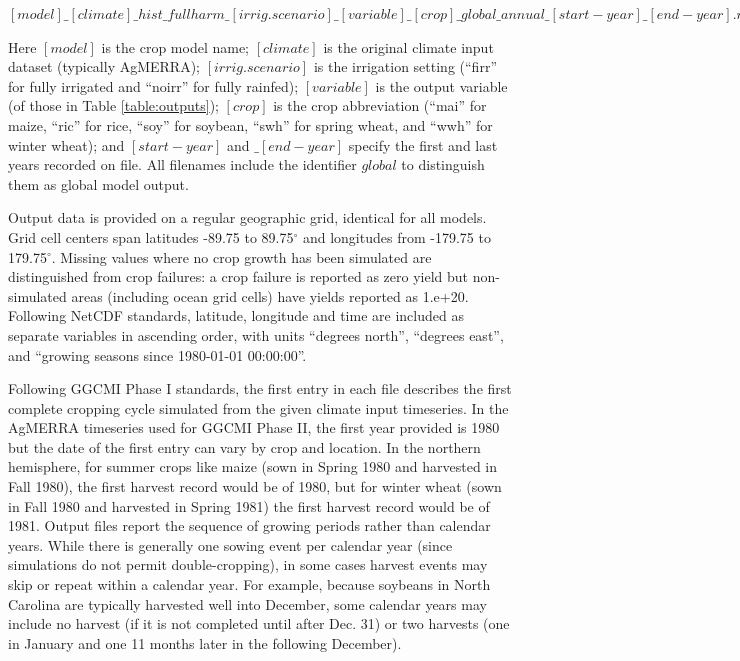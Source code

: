 \documentclass[gmd, manuscript]{copernicus} %
\begin{document}
$[model]\_[climate]\_hist\_fullharm\_[irrig.scenario]\_[variable]\_[crop]\_global\_annual\_[start-year]\_[end-year].nc4$

\noindent Here $[model]$ is the crop model name; $[climate]$ is the original climate input dataset (typically AgMERRA); $[irrig.scenario]$ is the irrigation setting (``firr'' for fully irrigated and ``noirr'' for fully rainfed); $[variable]$ is the output variable (of those in Table \ref{table:outputs}); $[crop]$ is the crop abbreviation (``mai'' for maize, ``ric'' for rice, ``soy'' for soybean, ``swh'' for spring wheat, and ``wwh'' for winter wheat); and $[start-year]$ and $\_[end-year]$ specify the first and last years recorded on file.
All filenames include the identifier $global$ to distinguish them as global model output.

Output data is provided on a regular geographic grid, identical for all models. 
Grid cell centers span latitudes -89.75 to 89.75$^{\circ}$ and longitudes from -179.75 to 179.75$^{\circ}$. 
Missing values  where no crop growth has been simulated are distinguished from crop failures: a crop failure is reported as zero yield but non-simulated areas (including ocean grid cells) have yields reported as 1.e+20. 
Following NetCDF standards, latitude, longitude and time are included as separate variables in ascending order, with
units ``degrees north'', ``degrees east'', and ``growing seasons since 1980-01-01 00:00:00''. 

Following GGCMI Phase I standards, the first entry in each file describes the first complete cropping cycle simulated from the given climate input timeseries. 
In the AgMERRA timeseries used for GGCMI Phase II, the first year provided is 1980 but the date of the first entry can vary by crop and location. 
In the northern hemisphere, for summer crops like maize (sown in Spring 1980 and harvested in Fall 1980), the first harvest record would be of 1980, but for winter wheat (sown in Fall 1980 and harvested in Spring 1981) the first harvest record would be of 1981. Output files report the sequence of growing periods rather than calendar years. 
While there is generally one sowing event per calendar year (since simulations do not permit double-cropping), in some cases harvest events may skip or repeat within a calendar year. For example, because soybeans in North Carolina are typically harvested well into December, some calendar years may include no harvest (if it is not completed until after Dec. 31) or two harvests (one in January and one 11 months later in the following December). 
\end{document}
